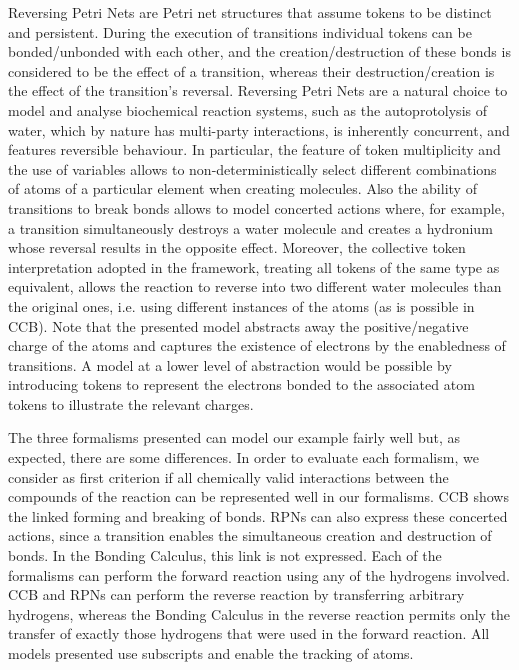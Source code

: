 \documentclass[runningheads]{llncs}
\begin{document}
Reversing Petri Nets are Petri net structures that assume tokens to be distinct and persistent. During the execution of transitions individual tokens can be bonded/unbonded with each other, and the creation/destruction of these bonds is considered to be the effect of a transition, whereas their destruction/creation is the effect of the transition's reversal. Reversing Petri Nets are a natural choice to model and analyse biochemical reaction systems, such as the autoprotolysis of water, which by nature
has multi-party interactions, is inherently concurrent, and features reversible behaviour. 
In particular, the feature of token multiplicity and
the use of variables allows to non-deterministically
select different combinations of atoms of a particular element when creating molecules. Also the ability
of 
transitions to break bonds allows to model concerted actions where, for example, a transition simultaneously
destroys  a water molecule and creates a hydronium whose  reversal results in the opposite effect. Moreover,
the collective token interpretation adopted in the framework, treating all tokens of the same type
as equivalent, allows the reaction to reverse into two different water molecules than the original ones,
i.e. using different instances of the atoms (as is possible in CCB).
Note that the presented model abstracts away the positive/negative charge of the atoms and
captures the existence of electrons by the enabledness of transitions. A model at a lower
level of abstraction would be possible by introducing tokens to represent the electrons  bonded to the associated
atom tokens to illustrate the relevant charges. 


The three formalisms presented can model our example fairly well but, as expected, 
there are some differences. In order to evaluate each formalism, we consider as first criterion if all 
chemically valid interactions between the compounds of the reaction can be represented well in 
our formalisms. 
CCB shows the linked forming and breaking of bonds.
RPNs can also express these concerted actions,
since a transition enables the simultaneous creation and destruction of bonds. 
In the Bonding Calculus, this link is not expressed. Each of the formalisms 
can perform the forward reaction using any of the hydrogens involved. CCB and RPNs can perform 
the reverse reaction by transferring arbitrary hydrogens, whereas the Bonding Calculus in  the reverse
reaction permits only the transfer of exactly those hydrogens that were used in the forward reaction. 
All models presented use subscripts and enable the tracking of atoms.
\end{document}
